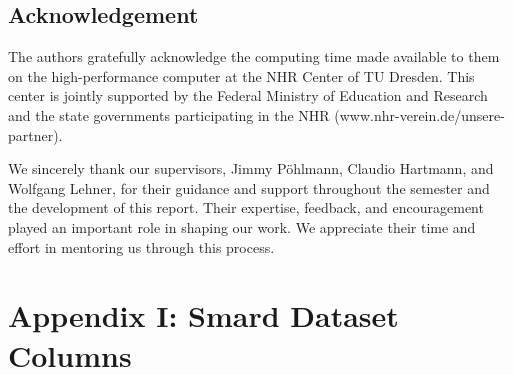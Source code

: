 \documentclass[a4paper]{article}
\begin{document}
    \vspace{15em}\subsection{Acknowledgement}\label{acknowledgement}

The authors gratefully acknowledge the computing time made available to
them on the high-performance computer at the NHR Center of TU Dresden.
This center is jointly supported by the Federal Ministry of Education
and Research and the state governments participating in the NHR
(www.nhr-verein.de/unsere-partner).

We sincerely thank our supervisors, Jimmy Pöhlmann, Claudio Hartmann,
and Wolfgang Lehner, for their guidance and support throughout the
semester and the development of this report. Their expertise, feedback,
and encouragement played an important role in shaping our work. We
appreciate their time and effort in mentoring us through this process.

    \newpage\appendix
\section{Appendix I: Smard Dataset
Columns}\label{appendix-i-smard-dataset-columns}
\end{document}
